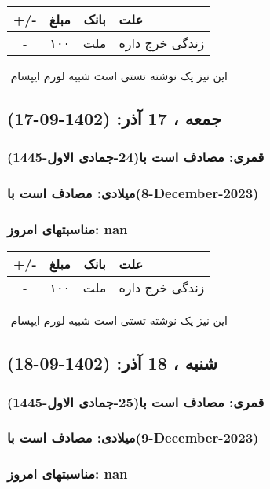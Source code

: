 \documentclass{article}
\newcommand{\rnote}[1]{\marginpar{\textcolor{color}{\StrSubstitute{\##1}{ }{\_}}}}
\newcommand{\myRow}[4]{
    #1 & #2 & #3 & #4 \\ \hline
}
\begin{document}
\begin{tabular}{ | c | c | c | p{5cm} |}
    \hline
    \myRow{ +/- }{مبلغ}{بانک}{علت}
    \myRow{-}{۱۰۰}{ملت}{زندگی خرج داره}
\end{tabular}
\newline
\newline

‌
\rnote{تست}
این نیز یک نوشته تستی است شبیه لورم ایپسام




\newpage
{}
\textcolor{color}{
\section{ جمعه ، 17 آذر: (1402-09-17) }
\subsubsection*{قمری: مصادف است با(24-جمادی الاول-1445)} 
\subsubsection*{میلادی: مصادف است با(8-December-2023)}
\subsubsection*{مناسبتهای امروز: nan}
}


\begin{tabular}{ | c | c | c | p{5cm} |}
    \hline
    \myRow{ +/- }{مبلغ}{بانک}{علت}
    \myRow{-}{۱۰۰}{ملت}{زندگی خرج داره}
\end{tabular}
\newline
\newline

‌
\rnote{تست}
این نیز یک نوشته تستی است شبیه لورم ایپسام




\newpage
{}
\textcolor{color}{
\section{ شنبه ، 18 آذر: (1402-09-18) }
\subsubsection*{قمری: مصادف است با(25-جمادی الاول-1445)} 
\subsubsection*{میلادی: مصادف است با(9-December-2023)}
\subsubsection*{مناسبتهای امروز: nan}
}
\end{document}
